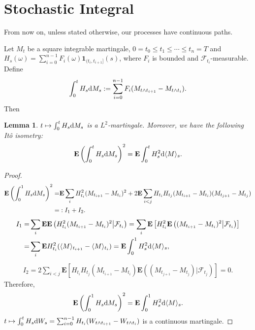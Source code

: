 \documentclass[twoside, 12pt]{book}
\numberwithin{equation}{chapter}
\newtheorem{lemma}[theorem]{Lemma}
\def\cF{{\mathcal F}}
\def\bE{{\mathbf E}}
\def\l{\left}
\def\r{\right}
\def\<{\langle}
\def\>{\rangle}
\def\leq{\leqslant}
\def\1{{\mathbf{1}}}
\def\d{\text{\rm{d}}}
\begin{document}
	\section{Stochastic Integral}
	
	From now on, unless stated otherwise, our processes have continuous paths. 
	
	
	Let $M_t$ be a square integrable martingale, $0=t_0\leq t_1\leq \cdots \leq t_{n}=T$ and $H_s(\omega) = \sum_{i=0}^{n-1} F_i(\omega)\1_{(t_{i},t_{i+1}]}(s)$, where $F_i$ is bounded and $\cF_{t_i}$-measurable. Define 
	\[
	\int_0^t H_s \d M_s:= \sum_{i=0}^{n-1} F_i (M_{t\wedge t_{i+1}}-M_{t\wedge t_{i}}). 
	\]
	Then 
	\begin{lemma}
		$t\mapsto \int_0^t H_s \d M_s$ is a $L^2$-martingale. Moreover, we have the following It\^o isometry:  
		\begin{equation}
			\bE \l(\int_0^t H_s \d M_s \r)^2 = \bE \int_0^t H_s^2 \d \<M\>_s. 
		\end{equation}
	\end{lemma}
	\begin{proof}
		\begin{align*}
			\bE \l(\int_0^1 H_s \d M_s\r)^2=& \bE \sum_{i} H_{t_i}^2 (M_{t_{i+1}}-M_{t_i})^2 + 2\bE \sum_{i<j} H_{t_i}H_{t_j}(M_{t_{i+1}}-M_{t_i})(M_{t_{j+1}}-M_{t_j}) \\
			=&: I_1+ I_2. 
		\end{align*}
		\begin{align*}
			\begin{aligned}
				I_1=&\sum_{i} \bE \bE \l(H_{t_i}^2 (M_{t_{i+1}}-M_{t_i})^2\big|\cF_{t_i}\r)= \sum_{i} \bE \l[ H_{t_i}^2 \bE\l( (M_{t_{i+1}}-M_{t_i})^2\big|\cF_{t_i}\r) \r] \\
				=&\sum_{i}  \bE H_{t_i}^2 (\<M\>_{t_{i+1}}-\<M\>_{t_{i}})= \bE  \int_0^1 H^2_s \d \<M\>_s ,
			\end{aligned}
		\end{align*}
		\begin{align*}
			I_2= 2\sum_{i<j} \bE \l[  H_{t_i}H_{t_j}(M_{t_{i+1}}-M_{t_i}) \bE \l( (M_{t_{j+1}}-M_{t_j}) \big|\cF_{t_j}\r) \r]=0. 
		\end{align*}
		Therefore, 
		\begin{equation*}
			\bE \l(\int_0^1 H_s \d M_s\r)^2=  \bE  \int_0^1 H^2_s \d \<M\>_s. 
		\end{equation*}
		$t\mapsto \int_0^t H_s \d W_s=  \sum_{i=0}^{n-1} H_{t_i}(W_{t\wedge t_{i+1}}-W_{t\wedge t_i})$ is a continuous martingale. 
	\end{proof}
	
\end{document}
